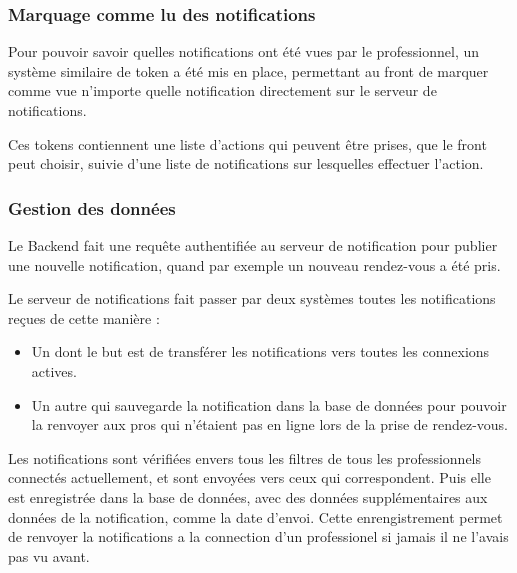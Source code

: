 \subsubsection{Marquage comme lu des notifications}

Pour pouvoir savoir quelles notifications ont été vues par le professionnel,
un système similaire de token a été mis en place, permettant au front de
marquer comme vue n'importe quelle notification directement sur le serveur de
notifications.

Ces tokens contiennent une liste d'actions qui peuvent être prises, que le
front peut choisir, suivie d'une liste de notifications sur lesquelles effectuer
l'action.

\subsubsection{Gestion des données}

Le Backend fait une requête authentifiée au serveur de notification pour publier
une nouvelle notification, quand par exemple un nouveau rendez-vous a été pris.

Le serveur de notifications fait passer par deux systèmes toutes les
notifications reçues de cette manière :

\begin{itemize}
	\item Un dont le but est de transférer les notifications vers toutes les
connexions actives.
	\item Un autre qui sauvegarde la notification dans la base de données pour pouvoir la
renvoyer aux pros qui n'étaient pas en ligne lors de la prise de rendez-vous.
\end{itemize}

Les notifications sont vérifiées envers tous les filtres de tous les
professionnels connectés actuellement, et sont envoyées vers ceux qui
correspondent. Puis elle est enregistrée dans la base de données, avec des
données supplémentaires aux données de la notification, comme la date d'envoi.
Cette enrengistrement permet de renvoyer la notifications a la connection d'un
professionel si jamais il ne l'avais pas vu avant.
